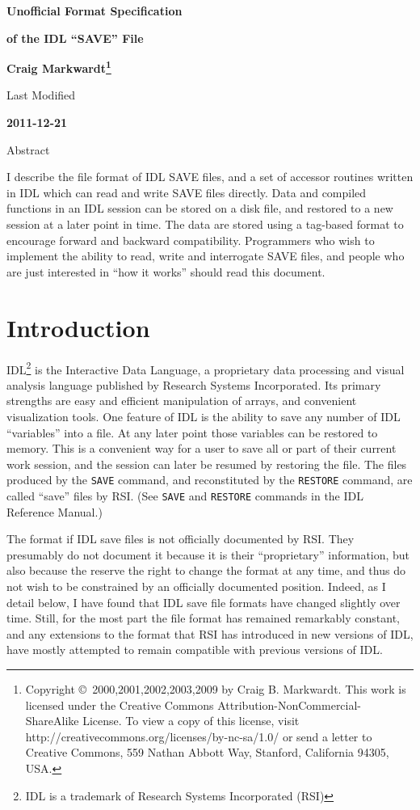 \documentclass[12pt]{article}
\begin{document}
\centerline{\bf\huge Unofficial Format Specification}
\centerline{\bf\huge of the IDL ``SAVE'' File}
\bigskip
\centerline{\bf Craig Markwardt\footnote{Copyright \copyright\ 2000,2001,2002,2003,2009 by Craig B. Markwardt.  This work is licensed under the Creative Commons Attribution-NonCommercial-ShareAlike License. To view a copy of this license, visit http://creativecommons.org/licenses/by-nc-sa/1.0/ or send a letter to Creative Commons, 559 Nathan Abbott Way, Stanford, California 94305, USA.}}
\smallskip
\centerline{Last Modified}
\centerline{\bf 2011-12-21}
\bigskip
\begin{center}
\begin{minipage}{4.5in}
\centerline{Abstract}
\bigskip
I describe the file format of IDL SAVE files, and a set of accessor
routines written in IDL which can read and write SAVE files directly.
Data and compiled functions in an IDL session can be stored on a disk
file, and restored to a new session at a later point in time.  The
data are stored using a tag-based format to encourage forward and
backward compatibility.  Programmers who wish to implement the ability
to read, write and interrogate SAVE files, and people who are just
interested in ``how it works'' should read this document.
\end{minipage}
\end{center}

\section{Introduction\label{s:intro}}

IDL\footnote{IDL is a trademark of Research Systems Incorporated
(RSI)} is the Interactive Data Language, a proprietary data processing
and visual analysis language published by Research Systems
Incorporated.  Its primary strengths are easy and efficient
manipulation of arrays, and convenient visualization tools.  One
feature of IDL is the ability to save any number of IDL ``variables''
into a file.  At any later point those variables can be restored to
memory.  This is a convenient way for a user to save all or part of
their current work session, and the session can later be resumed by
restoring the file.  The files produced by the {\tt SAVE} command, and
reconstituted by the {\tt RESTORE} command, are called ``save'' files
by RSI.  (See {\tt SAVE} and {\tt RESTORE} commands in the IDL
Reference Manual.)

The format if IDL save files is not officially documented by RSI.
They presumably do not document it because it is their ``proprietary''
information, but also because the reserve the right to change the
format at any time, and thus do not wish to be constrained by an
officially documented position.  Indeed, as I detail below, I have
found that IDL save file formats have changed slightly over time.
Still, for the most part the file format has remained remarkably
constant, and any extensions to the format that RSI has introduced in
new versions of IDL, have mostly attempted to remain compatible with
previous versions of IDL.
\end{document}
